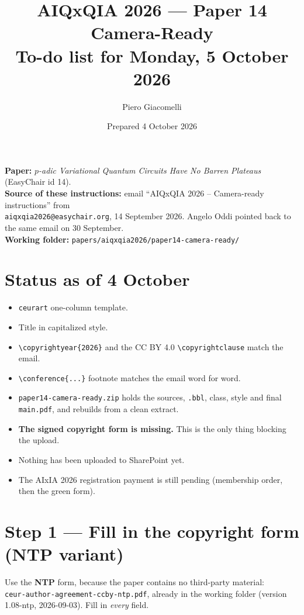 \documentclass[11pt,a4paper]{article}
\title{AIQxQIA 2026 --- Paper 14 Camera-Ready\\
  \large To-do list for Monday, 5 October 2026}
\author{Piero Giacomelli}
\date{Prepared 4 October 2026}
\begin{document}
\sloppy
\maketitle

\textbf{Paper:} \emph{$p$-adic Variational Quantum Circuits Have No Barren
Plateaus} (EasyChair id 14).\\
\textbf{Source of these instructions:} email ``AIQxQIA 2026 -- Camera-ready
instructions'' from\\ \texttt{aiqxqia2026@easychair.org}, 14 September 2026.
Angelo Oddi pointed back to the same email on 30 September.\\
\textbf{Working folder:}
\texttt{papers/aiqxqia2026/paper14-camera-ready/}

\section*{Status as of 4 October}
\begin{itemize}[itemsep=1pt]
  \item[\checkmark] \texttt{ceurart} one-column template.
  \item[\checkmark] Title in capitalized style.
  \item[\checkmark] \verb|\copyrightyear{2026}| and the CC BY 4.0
    \verb|\copyrightclause| match the email.
  \item[\checkmark] \verb|\conference{...}| footnote matches the email
    word for word.
  \item[\checkmark] \texttt{paper14-camera-ready.zip} holds the sources,
    \texttt{.bbl}, class, style and final \texttt{main.pdf}, and rebuilds
    from a clean extract.
  \item[$\times$] \textbf{The signed copyright form is missing.} This is the
    only thing blocking the upload.
  \item[$\times$] Nothing has been uploaded to SharePoint yet.
  \item[$\times$] The AIxIA 2026 registration payment is still pending
    (membership order, then the green form).
\end{itemize}

\section*{Step 1 --- Fill in the copyright form (NTP variant)}
Use the \textbf{NTP} form, because the paper contains no third-party
material:\\ \texttt{ceur-author-agreement-ccby-ntp.pdf}, already in the working folder (version 1.08-ntp, 2026-09-03). Fill in \emph{every} field.
\end{document}
